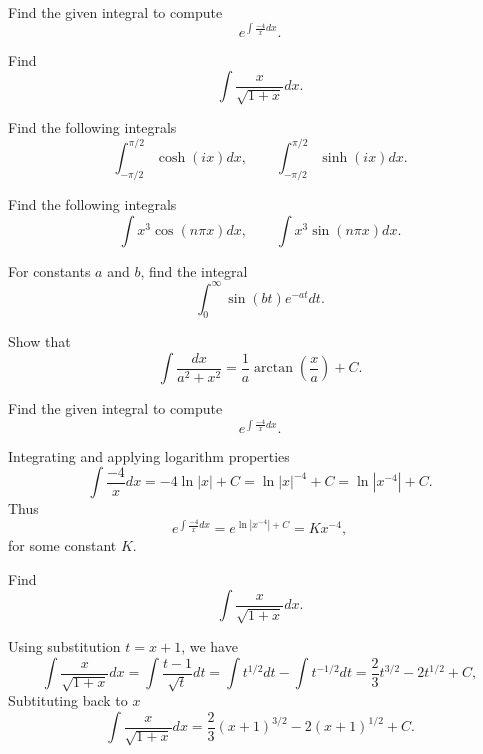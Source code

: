 \documentclass[11pt]{article}
\begin{document}
\makelabtitle

\begin{problem}
Find the given integral to compute
\[e^{\int \frac{-4}{x}dx}.\]
\end{problem}

\begin{problem}
Find
\[\int\frac{x}{\sqrt{1+x}}dx.\]
\end{problem}


\begin{problem}
Find the following integrals
\[\int^{\pi/2}_{-\pi/2}\cosh(ix)dx, \qquad \int^{\pi/2}_{-\pi/2}\sinh(ix)dx.\]
\end{problem}



\begin{problem}
Find the following integrals
\[\int x^{3}\cos(n\pi x)dx, \qquad \int x^{3}\sin(n\pi x)dx.\]
\end{problem}


\begin{problem}
For constants $a$ and $b$, find the integral
\[\int_{0}^{\infty} \sin(bt)e^{-at}dt.\]
\end{problem}


\begin{problem}
Show that
\[\int \frac{dx}{a^{2}+x^{2}}=\frac{1}{a}\arctan \left( \frac{x}{a} \right)+C.\]
\end{problem}









\LabSolutions

\begin{problem}
Find the given integral to compute
\[e^{\int \frac{-4}{x}dx}.\]
\end{problem}

\begin{solution}
Integrating and applying logarithm properties
\[\int \frac{-4}{x}dx = -4 \ln |x| + C = \ln |x|^{-4} + C = \ln |x^{-4}| +C.\]
Thus
\[\boxed{e^{\int \frac{-4}{x}dx} = e^{\ln |x^{-4}| +C} = K x^{-4}},\]
for some constant $K$.
\end{solution}


\begin{problem}
Find
\[\int\frac{x}{\sqrt{1+x}}dx.\]
\end{problem}
\begin{solution}
Using substitution $t = x +1$, we have
\[\int\frac{x}{\sqrt{1+x}}dx = \int\frac{t-1}{\sqrt{t}}dt=\int t^{1/2}dt - \int t^{-1/2}dt = \frac{2}{3}t^{3/2}-2t^{1/2}+C,\]
Subtituting back to $x$ 
\[\boxed{\int\frac{x}{\sqrt{1+x}}dx=\frac{2}{3}(x+1)^{3/2}-2(x+1)^{1/2}+C}.\]
\end{solution}
\end{document}
